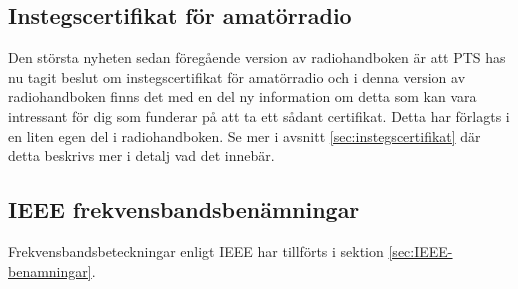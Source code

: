 \subsection*{Instegscertifikat för amatörradio}

Den största nyheten sedan föregående version av radiohandboken är att PTS has nu tagit beslut om instegscertifikat för amatörradio och i denna version av radiohandboken finns det med en del ny information om detta som kan vara intressant för dig som funderar på att ta ett sådant certifikat. Detta har förlagts i en liten egen del i radiohandboken. Se mer i avsnitt \ref{sec:instegscertifikat} där detta beskrivs mer i detalj vad det innebär.

\subsection*{IEEE frekvensbandsbenämningar}

Frekvensbandsbeteckningar enligt IEEE har tillförts i sektion \ref{sec:IEEE-benamningar}.

\clearpage
	
